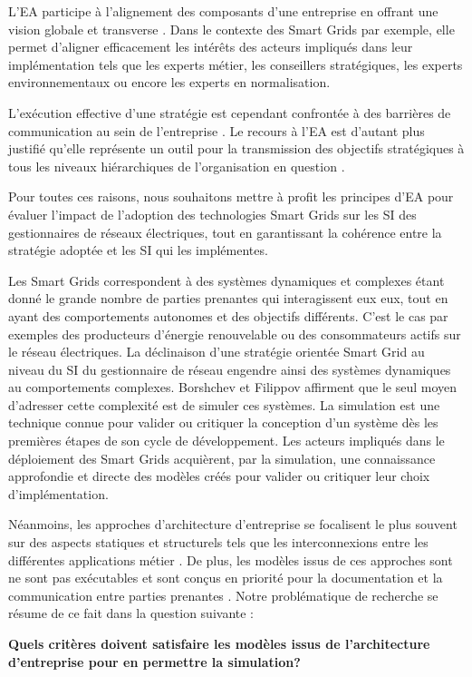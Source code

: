 L'EA participe à l'alignement des composants d'une entreprise en offrant une vision globale et transverse \cite{zachman1987framework}. Dans le contexte des Smart Grids par exemple, elle permet d'aligner efficacement les intérêts des acteurs impliqués dans leur implémentation tels que les experts métier, les conseillers stratégiques, les experts environnementaux ou encore les experts en normalisation.

L'exécution effective d'une stratégie est cependant confrontée à des barrières de communication au sein de l'entreprise \cite{vcater2010factors}. Le recours à l'EA est d'autant plus justifié qu'elle représente un outil pour la transmission des objectifs stratégiques à tous les niveaux hiérarchiques de l'organisation en question \cite{kappelman2008enterprise}. 

Pour toutes ces raisons, nous souhaitons mettre à profit les principes d'EA pour évaluer l'impact de l'adoption des technologies Smart Grids sur les SI des gestionnaires de réseaux électriques, tout en garantissant la cohérence entre la stratégie adoptée et les SI qui les implémentes. 




Les Smart Grids correspondent à des systèmes  dynamiques et complexes 
\cite{monti_power_2010} étant donné le grande nombre de parties prenantes qui interagissent eux eux, tout en ayant des comportements autonomes et des objectifs différents. C'est le cas par exemples des producteurs d'énergie renouvelable ou des consommateurs actifs sur le réseau électriques. La déclinaison d'une stratégie orientée Smart Grid au niveau du 
SI du gestionnaire de réseau engendre ainsi des systèmes dynamiques au comportements complexes. Borshchev et Filippov\cite{borshchev2004system} affirment que le seul moyen d'adresser cette complexité est de simuler ces systèmes. La simulation est une technique connue pour valider ou critiquer la conception d'un système dès les premières étapes de son cycle de développement. Les acteurs impliqués dans le déploiement des 
Smart Grids acquièrent, par la  simulation, une connaissance approfondie et 
directe des modèles créés pour valider ou critiquer leur choix d'implémentation.

Néanmoins, les approches d'architecture d'entreprise se focalisent le plus souvent sur 
des aspects statiques et structurels tels que les interconnexions entre les 
différentes applications métier \cite{buckl2008towards}. De plus, les modèles 
issus de ces approches sont ne sont pas exécutables et sont conçus en priorité pour la documentation et la communication entre parties prenantes \cite{kulkarni2013modelling}. Notre 
problématique de recherche se résume de ce fait dans la question suivante :

\textbf{Quels critères doivent satisfaire les modèles issus de l'architecture 
d'entreprise pour en permettre la simulation?}
     




